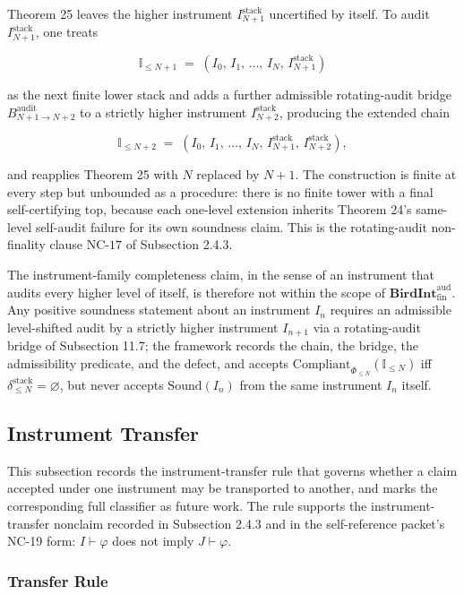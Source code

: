 \documentclass[11pt]{article}
\theoremstyle{definition}
\begin{document}
Theorem 25 leaves the higher instrument \(I_{N+1}^{\mathrm{stack}}\) uncertified by itself. To audit \(I_{N+1}^{\mathrm{stack}}\), one treats

\[
\mathbb I_{\le N+1}\;=\;(I_0,\,I_1,\,\ldots,\,I_N,\,I_{N+1}^{\mathrm{stack}})
\]

as the next finite lower stack and adds a further admissible rotating-audit bridge \(B^{\mathrm{audit}}_{N+1\to N+2}\) to a strictly higher instrument \(I_{N+2}^{\mathrm{stack}}\), producing the extended chain

\[
\mathbb I_{\le N+2}\;=\;(I_0,\,I_1,\,\ldots,\,I_N,\,I_{N+1}^{\mathrm{stack}},\,I_{N+2}^{\mathrm{stack}}),
\]

and reapplies Theorem 25 with \(N\) replaced by \(N+1\). The construction is finite at every step but unbounded as a procedure: there is no finite tower with a final self-certifying top, because each one-level extension inherits Theorem 24's same-level self-audit failure for its own soundness claim. This is the rotating-audit non-finality clause \(\mathrm{NC}\text{-}17\) of Subsection 2.4.3.

The instrument-family completeness claim, in the sense of an instrument that audits every higher level of itself, is therefore not within the scope of \(\mathbf{BirdInt}^{\mathrm{aud}}_{\mathrm{fin}}\). Any positive soundness statement about an instrument \(I_n\) requires an admissible level-shifted audit by a strictly higher instrument \(I_{n+1}\) via a rotating-audit bridge of Subsection 11.7; the framework records the chain, the bridge, the admissibility predicate, and the defect, and accepts \(\mathrm{Compliant}_{\Phi_{\le N}}(\mathbb I_{\le N})\) iff \(\delta_{\le N}^{\mathrm{stack}}=\varnothing\), but never accepts \(\mathrm{Sound}(I_n)\) from the same instrument \(I_n\) itself.

\subsection{Instrument Transfer}

This subsection records the instrument-transfer rule that governs whether a claim accepted under one instrument may be transported to another, and marks the corresponding full classifier as future work. The rule supports the instrument-transfer nonclaim recorded in Subsection 2.4.3 and in the self-reference packet's NC-19 form: \(I\vdash\varphi\) does not imply \(J\vdash\varphi\).

\subsubsection{Transfer Rule}
\end{document}
